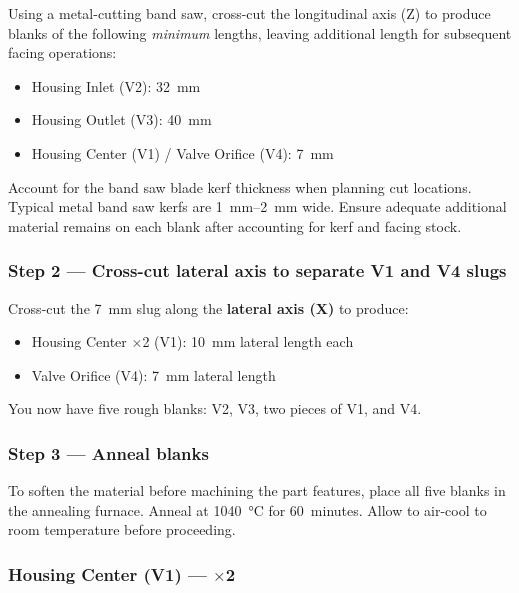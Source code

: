 \documentclass[12pt, letterpaper]{report}%
\newcounter{mycounter}           %
\newcounter{sub}[mycounter]      %
\begin{document}
\begin{appendices}
	Using a metal-cutting band saw, cross-cut the longitudinal axis (Z) to produce blanks
	of the following \textit{minimum} lengths, leaving additional length for subsequent
	facing operations:

	\begin{itemize}[itemsep=2pt]
		\item Housing Inlet (V2): \SI{32}{\milli\meter} 
		\item Housing Outlet (V3): \SI{40}{\milli\meter}
		\item Housing Center (V1) / Valve Orifice (V4): \SI{7}{\milli\meter}
	\end{itemize}

	\begin{notebox}
	Account for the band saw blade kerf thickness when planning cut locations.
	Typical metal band saw kerfs are \SIrange{1}{2}{\milli\meter} wide. Ensure adequate
	additional material remains on each blank after accounting for kerf and facing stock.
	\end{notebox}

	\subsubsection{Step 2 --- Cross-cut lateral axis to separate V1 and V4 slugs}

	Cross-cut the 7~mm slug along the \textbf{lateral axis (X)} to produce:

	\begin{itemize}[itemsep=2pt]
		\item Housing Center $\times$2 (V1): \SI{10}{\milli\meter} lateral length each
		\item Valve Orifice (V4): \SI{7}{\milli\meter} lateral length
	\end{itemize}

	You now have five rough blanks: V2, V3, two pieces of V1, and V4.

	\subsubsection{Step 3 --- Anneal blanks}

	To soften the material before machining the part features,
	place all five blanks in the annealing furnace. Anneal at \SI{1040}{\degreeCelsius} for
	60~minutes. Allow to air-cool to room temperature before proceeding.

	\subsubsection{Housing Center (V1) --- $\times$2}
	\label{sec:mfg:V1}


\end{appendices}
\end{document}
